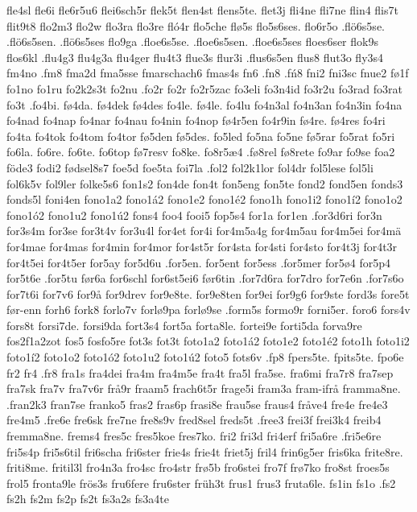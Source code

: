 fle4sl
fle6i
fle6r5u6
flei6sch5r
flek5t
flen4st
flens5te.
flet3j
fli4ne
fli7ne
flin4
flis7t
flit9t8
flo2m3
flo2w
flo3ra
flo3re
fló4r
flo5che
flø5s
flo5s6ses.
flo6r5o
.flö6s5se.
.flö6s5sen.
.flö6s5ses
flo9ga
.floe6s5se.
.floe6s5sen.
.floe6s5ses
floes6ser
flok9s
flos6kl
.flu4g3
flu4g3a
flu4ger
flu4t3
flue3s
flur3i
.flus6s5en
flus8
flut3o
fly3s4
fm4no
.fm8
fma2d
fma5sse
fmarschach6
fmas4s
fn6
.fn8
.fń8
fni2
fni3sc
fnue2
fø1f
fo1no
fo1ru
fo2k2s3t
fo2nu
.fo2r
fo2r
fo2r5zac
fo3eli
fo3n4id
fo3r2u
fo3rad
fo3rat
fo3t
.fo4bi.
fø4da.
fø4dek
fø4des
fo4le.
fø4le.
fo4lu
fo4n3al
fo4n3an
fo4n3in
fo4na
fo4nad
fo4nap
fo4nar
fo4nau
fo4nin
fo4nop
fø4r5en
fo4r9in
fø4re.
fø4res
fo4ri
fo4ta
fo4tok
fo4tom
fo4tor
fø5den
fø5des.
fo5led
fo5na
fo5ne
fø5rar
fo5rat
fo5ri
fo6la.
fo6re.
fo6te.
fo6top
fø7resv
fo8ke.
fo8r5æ4
.fø8rel
fø8rete
fo9ar
fo9se
foa2
föde3
fodi2
fødsel8s7
foe5d
foe5ta
foi7la
.fol2
fol2k1lor
fol4dr
fol5lese
fol5li
fol6k5v
fol9ler
folke5s6
fon1s2
fon4de
fon4t
fon5eng
fon5te
fond2
fond5en
fonds3
fonds5l
foni4en
fono1a2
fono1á2
fono1e2
fono1é2
fono1h
fono1i2
fono1í2
fono1o2
fono1ó2
fono1u2
fono1ú2
fons4
foo4
fooi5
fop5s4
for1a
for1en
.for3d6ri
for3n
for3s4m
for3se
for3t4v
for3u4l
for4et
for4i
for4m5a4g
for4m5au
for4m5ei
for4mä
for4mae
for4mas
for4min
for4mor
for4st5r
for4sta
for4sti
for4sto
for4t3j
for4t3r
for4t5ei
for4t5er
for5ay
for5d6u
.for5en.
for5ent
for5ess
.for5mer
for5ø4
for5p4
for5t6e
.for5tu
før6a
for6schl
for6st5ei6
før6tin
.for7d6ra
for7dro
for7e6n
.for7s6o
for7t6i
for7v6
for9å
for9drev
for9e8te.
for9e8ten
for9ei
for9g6
for9ste
ford3s
fore5t
før-enn
forh6
fork8
forlo7v
forlø9pa
forlø9se
.form5s
formo9r
forni5er.
foro6
fors4v
fors8t
forsi7de.
forsi9da
fort3s4
fort5a
forta8le.
fortei9e
forti5da
forva9re
fos2f1a2zot
fos5
fosfo5re
fot3s
fot3t
foto1a2
foto1á2
foto1e2
foto1é2
foto1h
foto1i2
foto1í2
foto1o2
foto1ó2
foto1u2
foto1ú2
foto5
fots6v
.fp8
fpers5te.
fpits5te.
fpo6e
fr2
fr4
.fr8
fra1s
fra4dei
fra4m
fra4m5e
fra4t
fra5l
fra5se.
fra6mi
fra7r8
fra7sep
fra7sk
fra7v
fra7v6r
frå9r
fraam5
frach6t5r
frage5i
fram3a
fram-ifrå
framma8ne.
.fran2k3
fran7se
franko5
fras2
fras6p
frasi8e
frau5se
fraus4
fråve4
fre4e
fre4e3
fre4m5
.fre6e
fre6sk
fre7ne
fre8s9v
fred8sel
freds5t
.free3
frei3f
frei3k4
freib4
fremma8ne.
frems4
fres5c
fres5koe
fres7ko.
fri2
fri3d
fri4erf
fri5a6re
.fri5e6re
fri5s4p
fri5s6til
fri6scha
fri6ster
frie4s
frie4t
friet5j
fril4
frin6g5er
fris6ka
frite8re.
friti8me.
fritil3l
fro4n3a
fro4sc
fro4str
frø5b
fro6stei
fro7f
frø7ko
fro8st
froes5s
frol5
fronta9le
frös3s
fru6fere
fru6ster
früh3t
frus1
frus3
fruta6le.
fs1in
fs1o
.fs2
fs2h
fs2m
fs2p
fs2t
fs3a2s
fs3a4te
